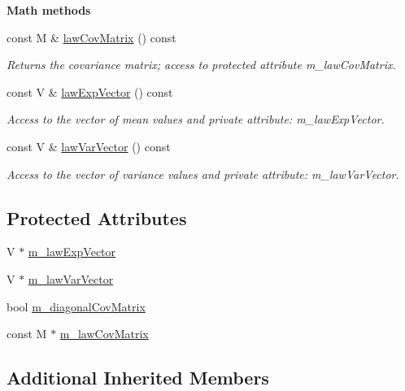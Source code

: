 \begin{Indent}{\bf Math methods}
\begin{DoxyCompactItemize}
const M \& \hyperlink{class_q_u_e_s_o_1_1_gaussian_joint_pdf_a7f687f734404afd0e8b7e92b3d26e8bb}{law\-Cov\-Matrix} () const 
\begin{DoxyCompactList}\small\item\em Returns the covariance matrix; access to protected attribute m\-\_\-law\-Cov\-Matrix. \end{DoxyCompactList}\item 
const V \& \hyperlink{class_q_u_e_s_o_1_1_gaussian_joint_pdf_a927c7abde2026d17586013a04a0a053e}{law\-Exp\-Vector} () const 
\begin{DoxyCompactList}\small\item\em Access to the vector of mean values and private attribute\-: m\-\_\-law\-Exp\-Vector. \end{DoxyCompactList}\item 
const V \& \hyperlink{class_q_u_e_s_o_1_1_gaussian_joint_pdf_ae7af4530bc9394393f3383b6321bc839}{law\-Var\-Vector} () const 
\begin{DoxyCompactList}\small\item\em Access to the vector of variance values and private attribute\-: m\-\_\-law\-Var\-Vector. \end{DoxyCompactList}\end{DoxyCompactItemize}
\end{Indent}
\subsection*{Protected Attributes}
\begin{DoxyCompactItemize}
\item 
V $\ast$ \hyperlink{class_q_u_e_s_o_1_1_gaussian_joint_pdf_a8ef2407f5234ce5e0ed0d05a21f183e5}{m\-\_\-law\-Exp\-Vector}
\item 
V $\ast$ \hyperlink{class_q_u_e_s_o_1_1_gaussian_joint_pdf_a35008ff77d5f572a7ee58fef4bfc536d}{m\-\_\-law\-Var\-Vector}
\item 
bool \hyperlink{class_q_u_e_s_o_1_1_gaussian_joint_pdf_a7e18c86c60bd7dc4ceaadaab618c3241}{m\-\_\-diagonal\-Cov\-Matrix}
\item 
const M $\ast$ \hyperlink{class_q_u_e_s_o_1_1_gaussian_joint_pdf_af13b72027783d8db03721951a71087d8}{m\-\_\-law\-Cov\-Matrix}
\end{DoxyCompactItemize}
\subsection*{Additional Inherited Members}


